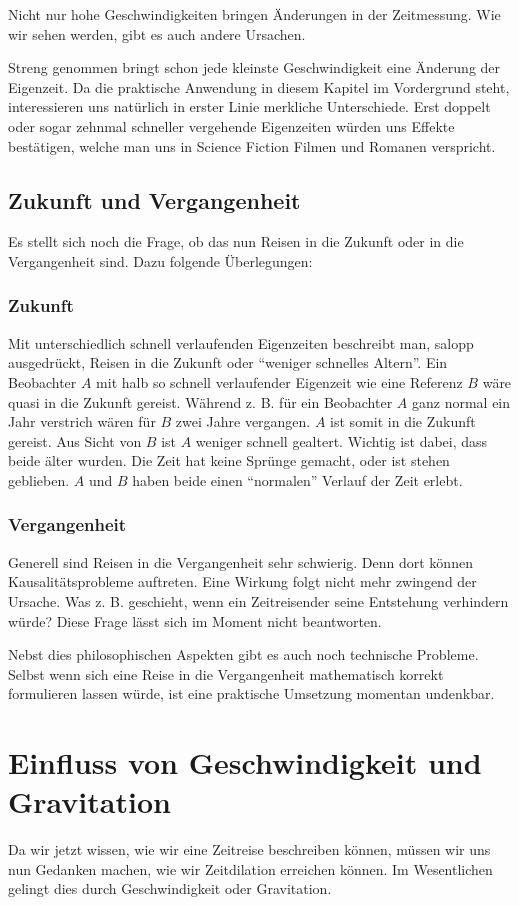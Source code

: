 \begin{refsection}
Nicht nur hohe Geschwindigkeiten bringen Änderungen in der Zeitmessung. Wie wir sehen werden, gibt es auch andere Ursachen.

Streng genommen bringt schon jede kleinste Geschwindigkeit eine Änderung der Eigenzeit. Da die praktische Anwendung in diesem Kapitel im Vordergrund steht, interessieren uns natürlich in erster Linie merkliche Unterschiede. Erst doppelt oder sogar zehnmal schneller vergehende Eigenzeiten würden uns Effekte bestätigen, welche man uns in Science Fiction Filmen und Romanen verspricht.

\subsection{Zukunft und Vergangenheit}
Es stellt sich noch die Frage, ob das nun Reisen in die Zukunft oder in die Vergangenheit sind. Dazu folgende Überlegungen:

\subsubsection{Zukunft}
Mit unterschiedlich schnell verlaufenden Eigenzeiten beschreibt man, salopp ausgedrückt, Reisen in die Zukunft oder ``weniger schnelles Altern''. Ein Beobachter $A$ mit halb so schnell verlaufender Eigenzeit wie eine Referenz $B$ wäre quasi in die Zukunft gereist.
Während z. B. für ein Beobachter $A$ ganz normal ein Jahr verstrich wären für $B$ zwei Jahre vergangen. $A$ ist somit in die Zukunft gereist. Aus Sicht von $B$ ist $A$ weniger schnell gealtert. Wichtig ist dabei, dass beide älter wurden. Die Zeit hat keine Sprünge gemacht, oder ist stehen geblieben. $A$ und $B$ haben beide einen ``normalen'' Verlauf der Zeit erlebt.

\subsubsection{Vergangenheit}
Generell sind Reisen in die Vergangenheit sehr schwierig. Denn dort können Kausalitätsprobleme auftreten. Eine Wirkung folgt nicht mehr zwingend der Ursache. Was z. B. geschieht, wenn ein Zeitreisender seine Entstehung verhindern würde? Diese Frage lässt sich im Moment nicht beantworten. 

Nebst dies philosophischen Aspekten gibt es auch noch technische Probleme. Selbst wenn sich eine Reise in die Vergangenheit mathematisch korrekt formulieren lassen würde, ist eine praktische Umsetzung momentan undenkbar.

\section{Einfluss von Geschwindigkeit und Gravitation}
Da wir jetzt wissen, wie wir eine Zeitreise beschreiben können, müssen wir uns nun Gedanken machen, wie wir Zeitdilation erreichen können. Im Wesentlichen gelingt dies durch Geschwindigkeit oder Gravitation. 

\end{refsection}
